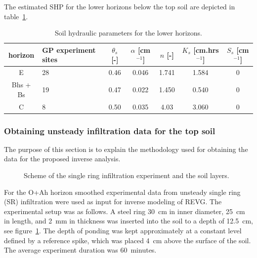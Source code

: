 \documentclass[review,times,3p,twocolumn,10pt]{elsarticle}
\newcommand{\fs}{\footnotesize}
\begin{document}
 



The estimated SHP for the lower horizons below the top soil are depicted in table~\ref{tab_SHP}.

\begin{table}[ht]
\begin{center}
\caption{Soil hydraulic parameters for the lower horizons.}
\fs
\begin{tabular}{c | p{2cm}| c c c c c}
\toprule
horizon &  GP experiment sites  & $\theta_s$ [-] & $\alpha$ [cm$^{-1}$]& $n$ [-]& $K_s$ [cm.hrs$^{-1}$] & $S_s$ [cm$^{-1}$] \\ \hline
E & 28 &  0.46 & 0.046 & 1.741 & 1.584 & 0\\
Bhs + Bs & 19  &0.47&  0.022 & 1.450 & 0.540 & 0\\
C & 8 & 0.50 & 0.035 & 4.03 &  3.060 & 0 \\
\toprule
\end{tabular}
\label{tab_SHP}
\end{center}
\end{table}


\subsubsection{Obtaining unsteady infiltration data for the top soil}
\label{krivka}

The purpose of this section is to explain the methodology used for obtaining the data for the proposed inverse analysis. 


 \begin{figure}
\centering
{}
 \caption{Scheme of the single ring infiltration experiment and the soil layers. }
 \label{experiment}
\end{figure}


For the O+Ah horizon smoothed experimental data from unsteady single ring (SR) infiltration were used as input for inverse modeling of REVG.
The experimental setup was as follows. A steel ring 30~cm in inner diameter, 25~cm in length, and 2~mm in thickness was inserted into the soil to a depth of 12.5~cm, see figure~\ref{experiment}. The depth of ponding was kept approximately at a constant level defined by a reference spike, which was placed 4~cm above the surface of the soil. The average experiment duration was 60~minutes.
\end{document}
